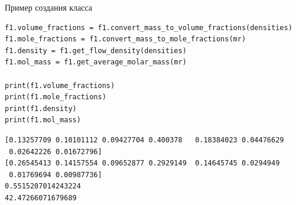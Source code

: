 \documentclass[aspectratio=169, mathserif]{beamer}	%
\begin{document}
\begin{frame}[fragile]{Пример создания класса}
\scriptsize
\begin{verbatim}
f1.volume_fractions = f1.convert_mass_to_volume_fractions(densities)
f1.mole_fractions = f1.convert_mass_to_mole_fractions(mr)
f1.density = f1.get_flow_density(densities)
f1.mol_mass = f1.get_average_molar_mass(mr)

print(f1.volume_fractions)
print(f1.mole_fractions)
print(f1.density)
print(f1.mol_mass)
\end{verbatim}
\vfill
    \begin{Verbatim}[commandchars=\\\{\}]
[0.13257709 0.10101112 0.09427704 0.400378   0.18384023 0.04476629
 0.02642226 0.01672796]
[0.26545413 0.14157554 0.09652877 0.2929149  0.14645745 0.0294949
 0.01769694 0.00987736]
0.5515207014243224
42.47266071679689
    \end{Verbatim}
\vfill
\end{frame}


\end{document}
